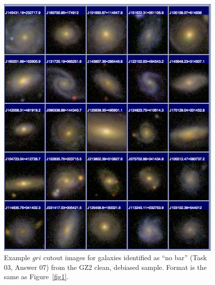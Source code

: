 \documentclass[useAMS,usenatbib]{mn2e}
\begin{document}
\newpage
\clearpage
\begin{figure}
\includegraphics[angle=0,width=7.0in]{figures/gallery/nobar.png}
\caption{Example $gri$ cutout images for galaxies identified as ``no bar'' (Task 03, Answer 07) from the GZ2 clean, debiased sample. Format is the same as Figure~\ref{fig1}.}
\end{figure}
\end{document}
